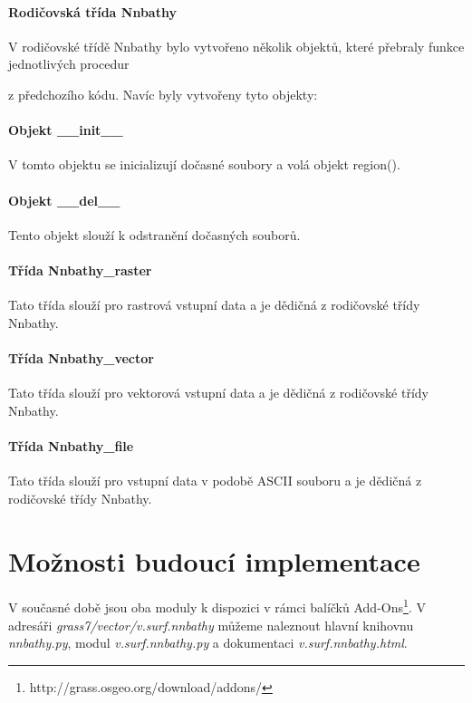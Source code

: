 \documentclass[12pt,a4paper]{article}
\begin{document}
{\paragraph{Rodičovská třída Nnbathy} V rodičovské třídě Nnbathy bylo
vytvořeno několik objektů, které přebraly funkce jednotlivých procedur

z předchozího kódu. Navíc byly vytvořeny tyto objekty:

\paragraph{Objekt \_\_init\_\_}
V tomto objektu se inicializují dočasné soubory a volá objekt region().

\paragraph{Objekt \_\_del\_\_}
Tento objekt slouží k odstranění dočasných souborů.

\paragraph{Třída Nnbathy\_raster}
Tato třída slouží pro rastrová vstupní data a je dědičná z rodičovské třídy Nnbathy.

\paragraph{Třída Nnbathy\_vector}
Tato třída slouží pro vektorová vstupní data a je dědičná z rodičovské třídy Nnbathy.

\paragraph{Třída Nnbathy\_file}
Tato třída slouží pro vstupní data v podobě ASCII souboru a je dědičná z rodičovské třídy Nnbathy.





\newpage
\section{Možnosti budoucí implementace}
V současné době jsou oba moduly k dispozici v rámci balíčků
Add-Ons\footnote{http://grass.osgeo.org/download/addons/}. V adresáři
\emph{grass7/vector/v.surf.nnbathy} můžeme naleznout hlavní knihovnu
\emph{nnbathy.py}, modul \emph{v.surf.nnbathy.py} a dokumentaci
\emph{v.surf.nnbathy.html}.

}
\end{document}
